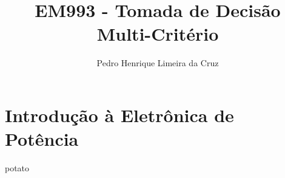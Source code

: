 \documentclass{article}
\author{Pedro Henrique Limeira da Cruz}
\title{EM993 - Tomada de Decisão Multi-Critério}
\begin{document}
    
    \maketitle
    \thispagestyle{empty}
    
    
    \newpage
    \tableofcontents
    \newpage
    \section{Introdução à Eletrônica de Potência}
        
    \newpage
    \begin{note}
        potato
    \end{note}
\end{document}
